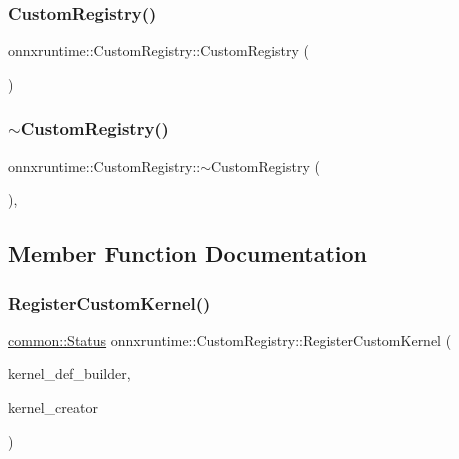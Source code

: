 \subsubsection{\texorpdfstring{Custom\+Registry()}{CustomRegistry()}}
{\footnotesize\ttfamily onnxruntime\+::\+Custom\+Registry\+::\+Custom\+Registry (\begin{DoxyParamCaption}{ }\end{DoxyParamCaption})\hspace{0.3cm}{\ttfamily [default]}}

\mbox{\label{classonnxruntime_1_1CustomRegistry_aaf13ddea9c56607927b6a2e00623a1df}} 
\subsubsection{\texorpdfstring{$\sim$\+Custom\+Registry()}{~CustomRegistry()}}
{\footnotesize\ttfamily onnxruntime\+::\+Custom\+Registry\+::$\sim$\+Custom\+Registry (\begin{DoxyParamCaption}{ }\end{DoxyParamCaption})\hspace{0.3cm}{\ttfamily [override]}, {\ttfamily [default]}}



\subsection{Member Function Documentation}
\mbox{\label{classonnxruntime_1_1CustomRegistry_a577dc63a5dc382790c62341054fc39e4}} 
\subsubsection{\texorpdfstring{Register\+Custom\+Kernel()}{RegisterCustomKernel()}\hspace{0.1cm}{\footnotesize\ttfamily [1/2]}}
{\footnotesize\ttfamily \mbox{\hyperlink{classonnxruntime_1_1common_1_1Status}{common\+::\+Status}} onnxruntime\+::\+Custom\+Registry\+::\+Register\+Custom\+Kernel (\begin{DoxyParamCaption}\item[{\mbox{\hyperlink{classonnxruntime_1_1KernelDefBuilder}{Kernel\+Def\+Builder}} \&}]{kernel\+\_\+def\+\_\+builder,  }\item[{const \mbox{\hyperlink{namespaceonnxruntime_a2e23731e78afbe4e5e15a18493162335}{Kernel\+Create\+Fn}} \&}]{kernel\+\_\+creator }\end{DoxyParamCaption})}

